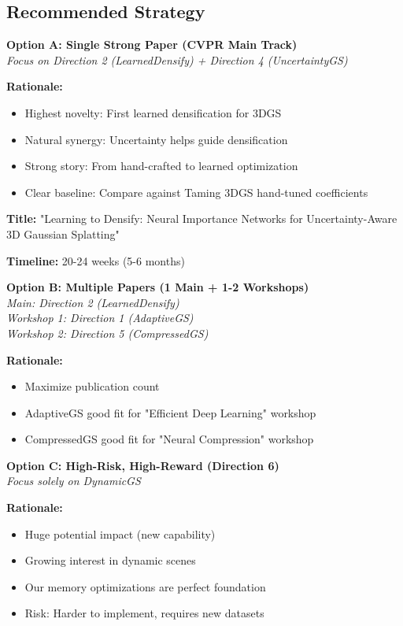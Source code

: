 \documentclass[11pt,letterpaper]{article}
\begin{document}
\subsection{Recommended Strategy}

\textbf{Option A: Single Strong Paper (CVPR Main Track)} \\
\textit{Focus on Direction 2 (LearnedDensify) + Direction 4 (UncertaintyGS)}

\textbf{Rationale:}
\begin{itemize}[leftmargin=*]
    \item Highest novelty: First learned densification for 3DGS
    \item Natural synergy: Uncertainty helps guide densification
    \item Strong story: From hand-crafted to learned optimization
    \item Clear baseline: Compare against Taming 3DGS hand-tuned coefficients
\end{itemize}

\textbf{Title:} "Learning to Densify: Neural Importance Networks for Uncertainty-Aware 3D Gaussian Splatting"

\textbf{Timeline:} 20-24 weeks (5-6 months)

\vspace{1em}

\textbf{Option B: Multiple Papers (1 Main + 1-2 Workshops)} \\
\textit{Main: Direction 2 (LearnedDensify)} \\
\textit{Workshop 1: Direction 1 (AdaptiveGS)} \\
\textit{Workshop 2: Direction 5 (CompressedGS)}

\textbf{Rationale:}
\begin{itemize}[leftmargin=*]
    \item Maximize publication count
    \item AdaptiveGS good fit for "Efficient Deep Learning" workshop
    \item CompressedGS good fit for "Neural Compression" workshop
\end{itemize}

\vspace{1em}

\textbf{Option C: High-Risk, High-Reward (Direction 6)} \\
\textit{Focus solely on DynamicGS}

\textbf{Rationale:}
\begin{itemize}[leftmargin=*]
    \item Huge potential impact (new capability)
    \item Growing interest in dynamic scenes
    \item Our memory optimizations are perfect foundation
    \item Risk: Harder to implement, requires new datasets
\end{itemize}
\end{document}
